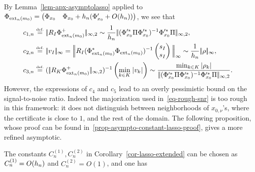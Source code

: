 By Lemma~\ref{lem-apx-asymptolasso} applied to $\Phi_{\operatorname{ext}_n(m_0)}=\begin{pmatrix} \Phi_{x_0} & \Phi_{x_0}+{h_n} (\Phi_{x_0}'+O({h_n}))
\end{pmatrix}$, we see that 
\begin{align}
	\label{eq-lipsch-lasso-cst-1}
c_{1,n}&\eqdef \norm{R_I \Phi_{\ext_n(m_0)}^+}_{\infty,2}\sim \frac{1}{\stepsizen}\norm{(\Phi_{x_0}'^*\Pi\Phi_{x_0}'^*)^{-1}\Phi_{x_0}'^*\Pi}_{\infty,2},\\
	\label{eq-lipsch-lasso-cst-2}
c_{2,n}&\eqdef \norm{v_I}_\infty=  \normb{R_I(\Phi_{\ext_n(m_0)}^*\Phi_{\ext_n(m_0)})^{-1} \begin{pmatrix}
    s_I\\s_I
  \end{pmatrix}}_\infty \sim \frac{1}{\stepsizen}\norm{\rho}_{\infty},\\ %
  \label{eq-lipsch-lasso-cst-3}
c_{3,n}&\eqdef (\norm{R_K \Phi_{\ext_n(m_0)}^+}_{\infty,2})^{-1}\left(\umin{k \in K} |v_{k}|\right) 
	\sim \frac{\min_{k \in K} |\rho_k|}{\norm{(\Phi_{x_0}'^*\Pi\Phi_{x_0}'^*)^{-1}\Phi_{x_0}'^*\Pi}_{\infty,2}}.
\end{align} %
  However, the expressions of $c_4$ and $c_5$ lead to an overly pessimistic bound on the signal-to-noise ratio. Indeed the majorization used in~\eqref{eq-rough-snr} is too rough in this framework: it does not distinguish between neighborhoods of $x_{0,\nu}$'s, where the certificate is close to $1$, and the rest of the domain. The following proposition, whose proof can be found in~\ref{prop-asympto-constant-lasso-proof}, gives a more refined asymptotic. 

\begin{prop}\label{prop-asympto-constant-lasso}
  The constants $C^{(1)}_n, C^{(2)}_n$ in Corollary~\ref{cor-lasso-extended} can be chosen as $C^{(1)}_n=O({h_n})$ and $C^{(2)}_n=O(1)$, and one has
\end{prop}




